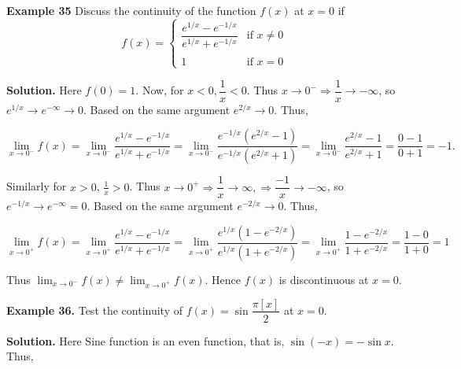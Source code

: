 \documentclass[../../main.tex]{subfiles}
\begin{document}
\vspace{0.2cm}
\textbf{Example 35}
\vspace{0.2cm}
Discuss the continuity of the function $f(x)$ at $x=0$ if 
\begin{equation*}
    f(x) =
\begin{cases}
    \dfrac{e^{1/x}-e^{-1/x}}{e^{1/x}+e^{-1/x}}     & \text{if    }      x \neq 0 \\\\
    1   & \text{if    }        x = 0
\end{cases}
\end{equation*}

\textbf{Solution.} Here $f(0)= 1$. Now, for $x < 0, \dfrac{1}{x} < 0.$  Thus  $x\rightarrow 0^- \Rightarrow \dfrac{1}{x}\rightarrow -\infty$, so $e^{1/x}\rightarrow e^{-\infty}   \rightarrow 0$. Based on the same argument $ e^{2/x} \rightarrow 0.$ Thus,

\begin{equation*}
\lim_{x\rightarrow 0^-}{f(x)} = \lim_{x\rightarrow 0^-}{\frac{e^{1/x}-e^{-1/x}}{e^{1/x}+ e^{-1/x}}} = \lim_{x\rightarrow 0^-}\frac{e^{-1/x}(e^{2/x}-1)}{e^{-1/x}(e^{2/x}+1)} = \lim_{x\rightarrow 0^-}\frac{e^{2/x}-1}{e^{2/x}+1} = \frac{0-1}{0+1} = -1.    
\end{equation*}

Similarly for $x > 0$, $\frac{1}{x} > 0$. Thus $x\rightarrow 0^+ \Rightarrow \dfrac{1}{x}\rightarrow \infty, \Rightarrow \dfrac{-1}{x}\rightarrow -\infty$, so $e^{-1/x}\rightarrow e^{-\infty} = 0$. Based on the same argument $e^{-2/x}\rightarrow 0$. Thus,

\begin{equation*}
\lim_{x\rightarrow 0^+}f(x) = \lim_{x\rightarrow 0^+}{\frac{e^{1/x}-e^{-1/x}}{e^{1/x}+ e^{-1/x}}} = \lim_{x\rightarrow 0^+}\frac{e^{1/x}(1-e^{-2/x})}{e^{1/x}(1+e^{-2/x})} = \lim_{x\rightarrow 0^+}\frac{1-e^{-2/x}}{1+e^{-2/x}} = \frac{1-0}{1+0} = 1    
\end{equation*}

Thus  $\lim_{x\rightarrow 0^-}{f(x)} \neq  \lim_{x\rightarrow 0^+}{f(x)}$. Hence $f(x)$ is discontinuous at $x=0$. 

\vspace{0.2cm}
\textbf{Example 36.}
\vspace{0.2cm}
Test the continuity of $f(x) = \sin\dfrac{\pi[x]}{2}$ at $x=0$.

\textbf{Solution.} Here Sine function is an even function, that is, $\sin (-x) = -\sin x$. Thus,
\end{document}
